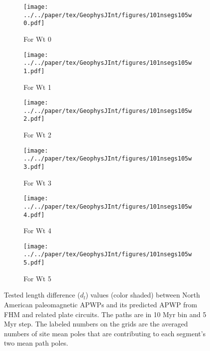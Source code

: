\begin{figure*}
	\centering
	\begin{subfigure}{.495\textwidth}
		\texttt{[image: ../../paper/tex/GeophysJInt/figures/101nsegs105w0.pdf]}
		\caption{For Wt 0}\label{fig-na-dlw0}
	\end{subfigure}
	\vspace{.1em}
	\begin{subfigure}{.495\textwidth}
		\texttt{[image: ../../paper/tex/GeophysJInt/figures/101nsegs105w1.pdf]}
		\caption{For Wt 1}\label{fig-na-dlw1}
	\end{subfigure}
	\vspace{.1em}
	\begin{subfigure}{.495\textwidth}
		\texttt{[image: ../../paper/tex/GeophysJInt/figures/101nsegs105w2.pdf]}
		\caption{For Wt 2}\label{fig-na-dlw2}
	\end{subfigure}
	\vspace{.1em}
	\begin{subfigure}{.495\textwidth}
		\texttt{[image: ../../paper/tex/GeophysJInt/figures/101nsegs105w3.pdf]}
		\caption{For Wt 3}\label{fig-na-dlw3}
	\end{subfigure}
	\vspace{.1em}
	\begin{subfigure}{.495\textwidth}
		\texttt{[image: ../../paper/tex/GeophysJInt/figures/101nsegs105w4.pdf]}
		\caption{For Wt 4}\label{fig-na-dlw4}
	\end{subfigure}
	\vspace{.1em}
	\begin{subfigure}{.495\textwidth}
		\texttt{[image: ../../paper/tex/GeophysJInt/figures/101nsegs105w5.pdf]}
		\caption{For Wt 5}\label{fig-na-dlw5}
	\end{subfigure}
	\caption[dl of each pair of segments for North American 10/5 Myr
APWPs]{Tested length difference ($d_l$) values (color shaded) between North
American paleomagnetic APWPs and its predicted APWP from FHM and related plate
circuits. The paths are in 10 Myr bin and 5 Myr step. The labeled numbers on the
grids are the averaged numbers of site mean poles that are contributing to each
segment's two mean path poles.}\label{fig-nadl}
\end{figure*}

